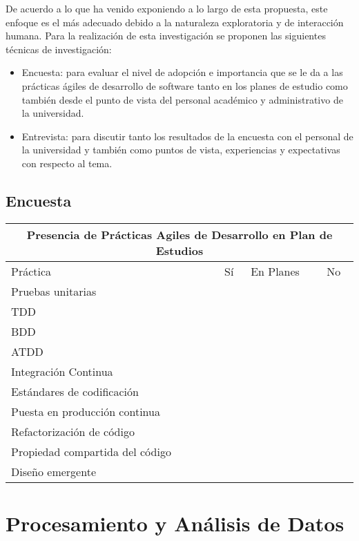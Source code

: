 De acuerdo a lo que ha venido exponiendo a lo largo de esta propuesta, este enfoque es el más adecuado debido a la naturaleza exploratoria y de interacción humana. Para la realización de esta investigación se proponen las siguientes técnicas de investigación:
\begin{itemize}
    \item Encuesta: para evaluar el nivel de adopción e importancia que se le da a las prácticas ágiles de desarrollo de software tanto en los planes de estudio como también desde el punto de vista del personal académico y administrativo de la universidad. 
    \item Entrevista: para discutir tanto los resultados de la encuesta con el personal de la universidad y también como puntos de vista, experiencias y expectativas con respecto al tema.   
\end{itemize}
 
\subsection{Encuesta}



\begin{tabular}{ |p{5cm}||p{2cm}|p{2cm}|p{2cm}|  }
 \toprule[1.5pt]
 \multicolumn{4}{|c|}{\textbf{Presencia de Prácticas Agiles de Desarrollo en Plan de Estudios}} \\
\toprule[1.5pt]
Práctica & Sí & En Planes & No \\
\toprule[1.5pt]
    Pruebas unitarias & & & \\
    \hline
    TDD & & & \\
    \hline
    BDD & & & \\
    \hline
    ATDD & & & \\
    \hline
    Integración Continua & & & \\
    \hline
    Estándares de codificación & & & \\
    \hline
    Puesta en producción continua & & & \\
    \hline
    Refactorización de código & & & \\
    \hline
    Propiedad compartida del código & & & \\
    \hline
    Diseño emergente & & & \\
 \hline
\end{tabular}






\section{Procesamiento y Análisis de Datos}